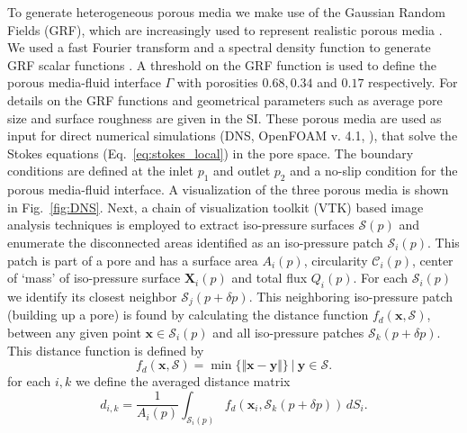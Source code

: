 \documentclass[draft]{agujournal2019}
\begin{document}
To generate heterogeneous porous media we make use of the Gaussian Random Fields (GRF), which are increasingly used to represent realistic porous media \cite{liu_advances_2019}. We used a fast Fourier transform and a spectral density function to generate GRF scalar functions \cite{teubner_level_1991,hyman_heterogeneities_2012,siena_relationship_2014}. A threshold on the GRF function is used to define the porous media-fluid interface $\Gamma$ with porosities $0.68, 0.34$ and $0.17$ respectively. For details on the GRF functions and geometrical parameters such as average pore size and surface roughness are given in the SI. These porous media are used as input for direct numerical simulations (DNS, OpenFOAM v. 4.1, ), that solve the Stokes equations (Eq.~\ref{eq:stokes_local}) in the pore space. The boundary conditions are defined at the inlet $p_1$ and outlet $p_2$ and a no-slip condition for the porous media-fluid interface. A visualization of the three porous media is shown in Fig.~\ref{fig:DNS}. Next, a chain of visualization toolkit (VTK) based image analysis techniques \cite{schroeder_visualization_2006,hernderson_paraview_2007} is employed to extract iso-pressure surfaces $\mathcal{S}(p)$ and enumerate the disconnected areas identified as an iso-pressure patch $\mathcal{S}_i(p)$. This patch is part of a pore and has a surface area $A_i(p)$, circularity $\mathcal{C}_i(p)$, center of `mass' of iso-pressure surface $\mathbf{X}_i(p)$ and total flux $Q_i(p)$. For each $\mathcal{S}_i(p)$ we identify its closest neighbor $\mathcal{S}_j(p+\delta p)$. This neighboring iso-pressure patch (building up a pore) is found by calculating the distance function $f_d(\mathbf{x},\mathcal{S})$, between any given point $\mathbf{x}\in \mathcal{S}_i(p)$ and all iso-pressure patches $\mathcal{S}_k(p+\delta p)$. This distance function is defined by
\begin{equation}
	f_d\left(\mathbf{x},\mathcal{S}\right) = \min \{\Vert\mathbf{x}-\mathbf{y}\Vert \} ~|~ \mathbf{y}\in \mathcal{S}.
\end{equation}
for each $i,k$ we define the averaged distance matrix 
\begin{equation}
	d_{i,k} = \frac{1}{A_i(p)}\int_{\mathcal{S}_i(p)} f_d(\mathbf{x}_i,\mathcal{S}_k(p+\delta p)) \,dS_i.
\end{equation}
\end{document}
